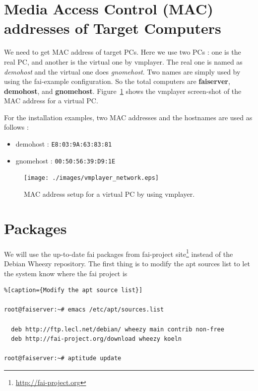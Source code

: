 \documentclass[11pt
  , a4paper
  , article
  , oneside
]{memoir}
\begin{document}
\section{Media Access Control (MAC) addresses of Target Computers}
We need to get MAC address of target PCs. Here we use two PCs : one is the real PC, and another is the virtual one by vmplayer. The real one is named as \textit{demohost} and the virtual one does \textit{gnomehost}. Two names are simply used by using the fai-example configuration. So the total computers are \textbf{faiserver}, \textbf{demohost}, and \textbf{gnomehost}. Figure~\ref{fig:vmplayer_network} shows the vmplayer screen-shot of the MAC address for a virtual PC.

For the installation examples, two MAC addresses and the hostnames are used as follows :
\begin{itemize}
\item demohost  : \texttt{E8:03:9A:63:83:81}
\item gnomehost : \texttt{00:50:56:39:D9:1E}
\end{itemize}
\begin{figure}[!htb]
  \centering
  \texttt{[image: ./images/vmplayer\_network.eps]}
  \caption{
            MAC address setup for a virtual PC by using vmplayer.
          }
  \label{fig:vmplayer_network}   
\end{figure}


\clearpage

\section{Packages}
We will use the up-to-date fai packages from fai-project site\footnote{\url{http://fai-project.org}} instead of the Debian Wheezy repository. The first thing is to modify the apt sources list to let the system know where the fai project is

\begin{lstlisting}%[caption={Modify the apt source list}]

root@faiserver:~# emacs /etc/apt/sources.list

  deb http://ftp.lecl.net/debian/ wheezy main contrib non-free
  deb http://fai-project.org/download wheezy koeln

root@faiserver:~# aptitude update

\end{lstlisting}
\end{document}
